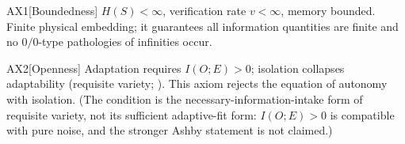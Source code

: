 \begin{axiom}{AX1}[Boundedness]\label{ax:1}
$H(S)<\infty$, verification rate $v<\infty$, memory bounded. Finite physical
embedding; it guarantees all information quantities are finite and no
$0/0$-type pathologies of infinities occur.
\end{axiom}

\begin{axiom}{AX2}[Openness]\label{ax:2}
Adaptation requires $I(O;E)>0$; isolation collapses adaptability (requisite
variety; \citealp{ashby1956}). This axiom rejects the equation of autonomy
with isolation. (The condition is the necessary-information-intake form of
requisite variety, not its sufficient adaptive-fit form: $I(O;E)>0$ is
compatible with pure noise, and the stronger Ashby statement is not claimed.)
\end{axiom}

